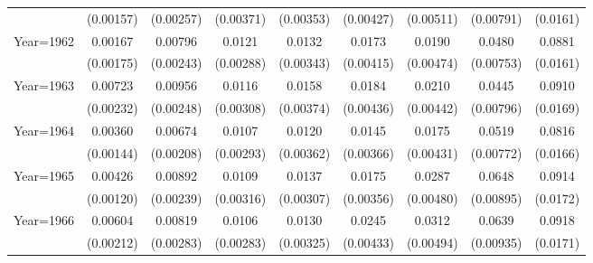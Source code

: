\begin{table}[htbp]
\begin{tabular}{l*{8}{c}}
                    &   (0.00157)         &   (0.00257)         &   (0.00371)         &   (0.00353)         &   (0.00427)         &   (0.00511)         &   (0.00791)         &    (0.0161)         \\
[1em]
Year=1962           &     0.00167         &     0.00796\sym{***}&      0.0121\sym{***}&      0.0132\sym{***}&      0.0173\sym{***}&      0.0190\sym{***}&      0.0480\sym{***}&      0.0881\sym{***}\\
                    &   (0.00175)         &   (0.00243)         &   (0.00288)         &   (0.00343)         &   (0.00415)         &   (0.00474)         &   (0.00753)         &    (0.0161)         \\
[1em]
Year=1963           &     0.00723\sym{***}&     0.00956\sym{***}&      0.0116\sym{***}&      0.0158\sym{***}&      0.0184\sym{***}&      0.0210\sym{***}&      0.0445\sym{***}&      0.0910\sym{***}\\
                    &   (0.00232)         &   (0.00248)         &   (0.00308)         &   (0.00374)         &   (0.00436)         &   (0.00442)         &   (0.00796)         &    (0.0169)         \\
[1em]
Year=1964           &     0.00360\sym{**} &     0.00674\sym{***}&      0.0107\sym{***}&      0.0120\sym{***}&      0.0145\sym{***}&      0.0175\sym{***}&      0.0519\sym{***}&      0.0816\sym{***}\\
                    &   (0.00144)         &   (0.00208)         &   (0.00293)         &   (0.00362)         &   (0.00366)         &   (0.00431)         &   (0.00772)         &    (0.0166)         \\
[1em]
Year=1965           &     0.00426\sym{***}&     0.00892\sym{***}&      0.0109\sym{***}&      0.0137\sym{***}&      0.0175\sym{***}&      0.0287\sym{***}&      0.0648\sym{***}&      0.0914\sym{***}\\
                    &   (0.00120)         &   (0.00239)         &   (0.00316)         &   (0.00307)         &   (0.00356)         &   (0.00480)         &   (0.00895)         &    (0.0172)         \\
[1em]
Year=1966           &     0.00604\sym{***}&     0.00819\sym{***}&      0.0106\sym{***}&      0.0130\sym{***}&      0.0245\sym{***}&      0.0312\sym{***}&      0.0639\sym{***}&      0.0918\sym{***}\\
                    &   (0.00212)         &   (0.00283)         &   (0.00283)         &   (0.00325)         &   (0.00433)         &   (0.00494)         &   (0.00935)         &    (0.0171)         \\

\end{tabular}
\end{table}

